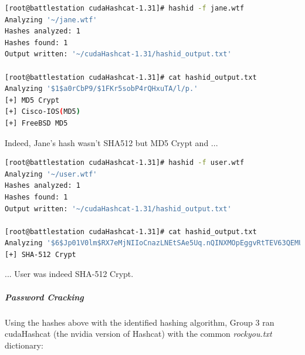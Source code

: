 \begin{lstlisting}[language=bash,caption={Identifying Jane}]
[root@battlestation cudaHashcat-1.31]# hashid -f jane.wtf
Analyzing '~/jane.wtf'
Hashes analyzed: 1
Hashes found: 1
Output written: '~/cudaHashcat-1.31/hashid_output.txt'

[root@battlestation cudaHashcat-1.31]# cat hashid_output.txt 
Analyzing '$1$a0rCbP9/$1FKr5sobP4rQHxuTA/l/p.'
[+] MD5 Crypt
[+] Cisco-IOS(MD5)
[+] FreeBSD MD5
\end{lstlisting}

Indeed, Jane's hash wasn't SHA512 but MD5 Crypt and ...

\begin{lstlisting}[language=bash,caption={Identifying User}]
[root@battlestation cudaHashcat-1.31]# hashid -f user.wtf
Analyzing '~/user.wtf'
Hashes analyzed: 1
Hashes found: 1
Output written: '~/cudaHashcat-1.31/hashid_output.txt'

[root@battlestation cudaHashcat-1.31]# cat hashid_output.txt 
Analyzing '$6$Jp01V0lm$RX7eMjNIIoCnazLNEtSAe5Uq.nQINXMOpEggvRtTEV63QEMUEpmwFMJhYzQtLT/M33Kbl5Mhr59tPJbvN/u4k1'
[+] SHA-512 Crypt
\end{lstlisting}

... User was indeed SHA-512 Crypt.



\lstset{extendedchars=\true}
\lstset{inputencoding=ansinew}
\subparagraph{Password Cracking}
Using the hashes above with the identified hashing algorithm, Group 3 ran cudaHashcat (the nvidia version of Hashcat) with the common \textit{rockyou.txt} dictionary:

